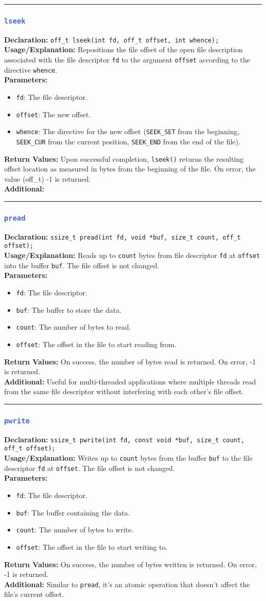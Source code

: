 \documentclass[openany,12pt]{book}
\newcommand{\code}[1]{\texttt{#1}}
\newcommand{\blue}[1]{\textcolor{RoyalBlue}{#1}}
\newcommand{\functionEntryPar}[6]{%
  \noindent\rule{\linewidth}{0.5pt}
  \subsubsection*{\blue{\large{\texttt{#1}}}}
  \textbf{Declaration:} \texttt{#2} \\
  \textbf{Usage/Explanation:} #3 \\
  \textbf{Parameters:}
  \begin{itemize}[leftmargin=*]
    #4
  \end{itemize}
  \textbf{Return Values:} #5 \\
  \textbf{Additional:} #6
  \vspace{1em}
}
\begin{document}
\functionEntryPar{lseek}
{off\_t lseek(int fd, off\_t offset, int whence);}
{Repositions the file offset of the open file description associated with the file descriptor \code{fd} to the argument \code{offset} according to the directive \code{whence}.}
{\item \code{fd}: The file descriptor.
 \item \code{offset}: The new offset.
 \item \code{whence}: The directive for the new offset (\code{SEEK\_SET} from the beginning, \code{SEEK\_CUR} from the current position, \code{SEEK\_END} from the end of the file).}
{Upon successful completion, \code{lseek()} returns the resulting offset location as measured in bytes from the beginning of the file. On error, the value (off\_t) -1 is returned.}
{\label{func:lseek}}

\functionEntryPar{pread}
{ssize\_t pread(int fd, void *buf, size\_t count, off\_t offset);}
{Reads up to \code{count} bytes from file descriptor \code{fd} at \code{offset} into the buffer \code{buf}. The file offset is not changed.}
{\item \code{fd}: The file descriptor.
 \item \code{buf}: The buffer to store the data.
 \item \code{count}: The number of bytes to read.
 \item \code{offset}: The offset in the file to start reading from.}
{On success, the number of bytes read is returned. On error, -1 is returned.}
{Useful for multi-threaded applications where multiple threads read from the same file descriptor without interfering with each other's file offset.\label{func:pread}}

\functionEntryPar{pwrite}
{ssize\_t pwrite(int fd, const void *buf, size\_t count, off\_t offset);}
{Writes up to \code{count} bytes from the buffer \code{buf} to the file descriptor \code{fd} at \code{offset}. The file offset is not changed.}
{\item \code{fd}: The file descriptor.
 \item \code{buf}: The buffer containing the data.
 \item \code{count}: The number of bytes to write.
 \item \code{offset}: The offset in the file to start writing to.}
{On success, the number of bytes written is returned. On error, -1 is returned.}
{Similar to \code{pread}, it's an atomic operation that doesn't affect the file's current offset.\label{func:pwrite}}
\end{document}
